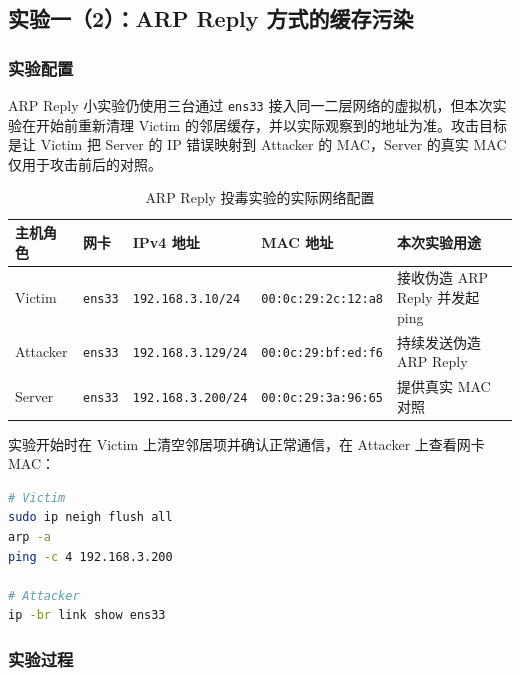 
\subsection{实验一（2）：ARP Reply 方式的缓存污染}

\subsubsection{实验配置}

ARP Reply 小实验仍使用三台通过 \texttt{ens33} 接入同一二层网络的虚拟机，但本次实验在开始前重新清理 Victim 的邻居缓存，并以实际观察到的地址为准。攻击目标是让 Victim 把 Server 的 IP 错误映射到 Attacker 的 MAC，Server 的真实 MAC 仅用于攻击前后的对照。

\begin{table}[H]
    \centering
    \caption{ARP Reply 投毒实验的实际网络配置}
    \label{tab:task1-reply-network}
    \renewcommand{\arraystretch}{1.25}
    \begin{tabularx}{\linewidth}{l l l l X}
        \toprule
        主机角色 & 网卡 & IPv4 地址 & MAC 地址 & 本次实验用途 \\
        \midrule
        Victim & \texttt{ens33} & \texttt{192.168.3.10/24} & \texttt{00:0c:29:2c:12:a8} & 接收伪造 ARP Reply 并发起 ping \\
        Attacker & \texttt{ens33} & \texttt{192.168.3.129/24} & \texttt{00:0c:29:bf:ed:f6} & 持续发送伪造 ARP Reply \\
        Server & \texttt{ens33} & \texttt{192.168.3.200/24} & \texttt{00:0c:29:3a:96:65} & 提供真实 MAC 对照 \\
        \bottomrule
    \end{tabularx}
\end{table}

实验开始时在 Victim 上清空邻居项并确认正常通信，在 Attacker 上查看网卡 MAC：

\begin{lstlisting}[language=bash,caption={ARP Reply 实验开始前的检查}]
# Victim
sudo ip neigh flush all
arp -a
ping -c 4 192.168.3.200

# Attacker
ip -br link show ens33
\end{lstlisting}

\subsubsection{实验过程}

